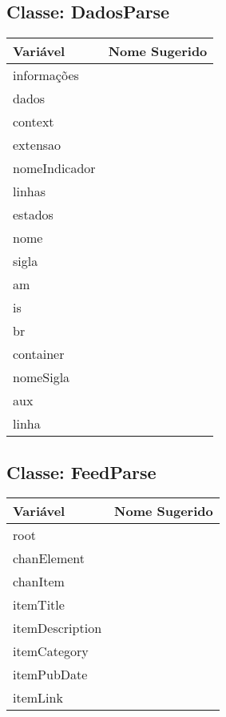 \documentclass[12pt]{article}
\begin{document}
	\subsection{Classe: DadosParse}
		\begin{table}[H]
			\begin{center}
				\begin{tabular}{l | l}
					\toprule
						Variável & Nome Sugerido\\
					\midrule
						informações & \\
						dados & \\
						context & \\
						extensao & \\
						nomeIndicador & \\
						linhas & \\
						estados & \\
						nome & \\
						sigla & \\
						am & \\
						is & \\
						br & \\
						container & \\
						nomeSigla & \\
						aux & \\
						linha & \\
					\bottomrule
				\end{tabular}
			\end{center}
		\end{table}

	\subsection{Classe: FeedParse}
		\begin{table}[H]
			\begin{center}
				\begin{tabular}{l | l}
					\toprule
						Variável & Nome Sugerido\\
					\midrule
						root & \\
						chanElement & \\
						chanItem & \\
						itemTitle & \\
						itemDescription & \\
						itemCategory & \\
						itemPubDate & \\
						itemLink & \\
					\bottomrule
				\end{tabular}
			\end{center}
		\end{table}
\end{document}
